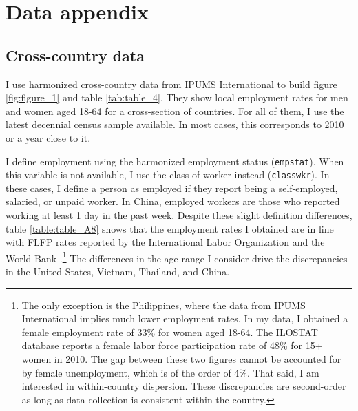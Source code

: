 



	


	
	
\orange{}
%	


\orange{}
\FloatBarrier




\section{Data appendix}


\subsection{Cross-country data}
\label{sec:country_data}
I use harmonized cross-country data from IPUMS International to build figure \ref{fig:figure_1} and table \ref{tab:table_4}. They show local employment rates for men and women aged 18-64 for a cross-section of countries. For all of them, I use the latest decennial census sample available. In most cases, this corresponds to 2010 or a year close to it.

I define employment using the harmonized employment status ({\tt empstat}). When this variable is not available, I use the class of worker instead ({\tt classwkr}). In these cases, I define a person as employed if they report being a self-employed, salaried, or unpaid worker. In China, employed workers are those who reported working at least 1 day in the past week. Despite these slight definition differences, table \ref{table:table_A8} shows that the employment rates I obtained are in line with FLFP rates reported by the International Labor Organization and the World Bank \citep{InternationalLaborOrganization2021}.\footnote{The only exception is the Philippines, where the data from IPUMS International implies much lower employment rates. In my data, I obtained a female employment rate of 33\% for women aged 18-64. The ILOSTAT database reports a female labor force participation rate of 48\% for 15+ women in 2010. The gap between these two figures cannot be accounted for by female unemployment, which is of the order of 4\%. That said, I am interested in within-country dispersion. These discrepancies are second-order as long as data collection is consistent within the country.} The differences in the age range I consider drive the discrepancies in the United States, Vietnam, Thailand, and China.


